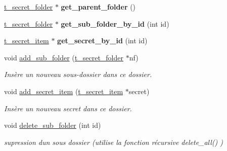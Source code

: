 \begin{DoxyCompactItemize}
\mbox{\label{classt__secret__folder_ab75ff3ac24e91ca178f3d9d04f6e4fd8}} 
\hyperlink{classt__secret__folder}{t\+\_\+secret\+\_\+folder} $\ast$ {\bfseries get\+\_\+parent\+\_\+folder} ()
\item 
\mbox{\label{classt__secret__folder_a3e7d632a8d5e16c33d4dfe2b92b540d4}} 
\hyperlink{classt__secret__folder}{t\+\_\+secret\+\_\+folder} $\ast$ {\bfseries get\+\_\+sub\+\_\+folder\+\_\+by\+\_\+id} (int id)
\item 
\mbox{\label{classt__secret__folder_a01f19e5595926138be4509261ec77691}} 
\hyperlink{classt__secret__item}{t\+\_\+secret\+\_\+item} $\ast$ {\bfseries get\+\_\+secret\+\_\+by\+\_\+id} (int id)
\item 
\mbox{\label{classt__secret__folder_a7805e40981016ee8a4ca599cae8fb4c4}} 
void \hyperlink{classt__secret__folder_a7805e40981016ee8a4ca599cae8fb4c4}{add\+\_\+sub\+\_\+folder} (\hyperlink{classt__secret__folder}{t\+\_\+secret\+\_\+folder} $\ast$nf)
\begin{DoxyCompactList}\small\item\em Insère un nouveau sous-\/dossier dans ce dossier. \end{DoxyCompactList}\item 
\mbox{\label{classt__secret__folder_ac145be3ce234a5a23551a8792e002f75}} 
void \hyperlink{classt__secret__folder_ac145be3ce234a5a23551a8792e002f75}{add\+\_\+secret\+\_\+item} (\hyperlink{classt__secret__item}{t\+\_\+secret\+\_\+item} $\ast$secret)
\begin{DoxyCompactList}\small\item\em Insère un nouveau secret dans ce dossier. \end{DoxyCompactList}\item 
\mbox{\label{classt__secret__folder_ae7539dade9ab114c4c11dadb632b8854}} 
void \hyperlink{classt__secret__folder_ae7539dade9ab114c4c11dadb632b8854}{delete\+\_\+sub\+\_\+folder} (int id)
\begin{DoxyCompactList}\small\item\em supression d\textquotesingle{}un sous dossier (utilise la fonction récursive delete\+\_\+all() ) \end{DoxyCompactList}\item 

\end{DoxyCompactItemize}
